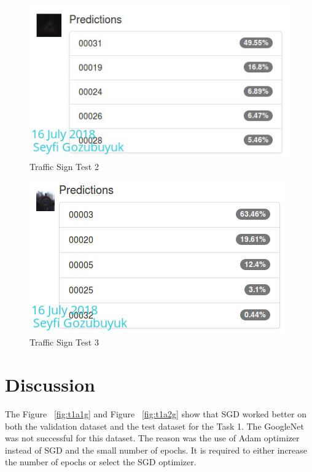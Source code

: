 \documentclass[10pt,journal,compsoc]{IEEEtran}
\begin{document}
\begin{figure}[thpb]
      \centering
      \includegraphics[width=\linewidth]{figures/t2t2.png}
      \caption{Traffic Sign Test 2}
      \label{fig:t2t2}
\end{figure}

\begin{figure}[thpb]
      \centering
      \includegraphics[width=\linewidth]{figures/t2t3.png}
      \caption{Traffic Sign Test 3}
      \label{fig:t2t3}
\end{figure}

\section{Discussion}
The Figure ~\ref{fig:t1a1g} and Figure ~\ref{fig:t1a2g} show that SGD worked better on both the validation dataset and the test dataset for the Task 1. The GoogleNet was not successful for this dataset. The reason was the use of Adam optimizer instead of SGD and the small number of epochs. It is required to either increase the number of epochs or select the SGD optimizer.\\
\end{document}
